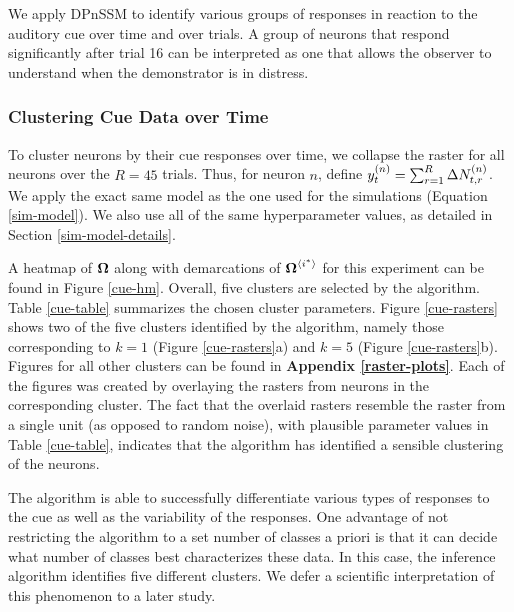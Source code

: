 \documentclass[twoside]{article}
\begin{document}
We apply DPnSSM to identify various groups of responses in reaction to the auditory cue over time and over trials.  A group of neurons that respond significantly after trial 16 can be interpreted as one that allows the observer to understand when the demonstrator is in distress.

\subsubsection{Clustering Cue Data over Time} \label{sssec:time-data}
To cluster neurons by their cue responses over time, we collapse the raster for all neurons over the $R = 45$ trials.  Thus, for neuron $n$, define $\idx[t] y n = \sum_{r=1}^R \Delta \idx[t, r] N n$.  We apply the exact same model as the one used for the simulations (Equation \ref{sim-model}).  We also use all of the same hyperparameter values, as detailed in Section \ref{sim-model-details}.

A heatmap of $\bd \Omega$ along with demarcations of $\baidx \Omega {i^*}$ for this experiment can be found in Figure \ref{cue-hm}. Overall, five clusters are selected by the algorithm.  Table \ref{cue-table} summarizes the chosen cluster parameters. Figure \ref{cue-rasters} shows two of the five clusters identified by the algorithm, namely those corresponding to $k = 1$ (Figure \ref{cue-rasters}a) and $k = 5$ (Figure \ref{cue-rasters}b). Figures for all other clusters can be found in \textbf{Appendix \ref{raster-plots}}.  Each of the figures was created by overlaying the rasters from neurons in the corresponding cluster. The fact that the overlaid rasters resemble the raster from a single unit (as opposed to random noise), with plausible parameter values in Table \ref{cue-table}, indicates that the algorithm has identified a sensible clustering of the neurons. 

The algorithm is able to successfully differentiate various types of responses to the cue as well as the variability of the responses. One advantage of not restricting the algorithm to a set number of classes a priori is that it can decide what number of classes best characterizes these data. In this case, the inference algorithm identifies five different clusters. We defer a scientific interpretation of this phenomenon to a later study. 
\end{document}
